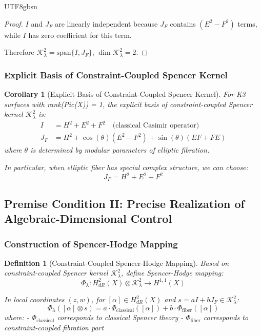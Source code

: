 \documentclass[a4paper,12pt]{extarticle}
\newtheorem{corollary}[theorem]{Corollary}
\newtheorem{definition}[theorem]{Definition}
\theoremstyle{definition}
\begin{document}
\begin{CJK}{UTF8}{gbsn}
\begin{proof}
$I$ and $J_F$ are linearly independent because $J_F$ contains $(E^2 - F^2)$ terms, while $I$ has zero coefficient for this term.

Therefore $\mathcal{K}^2_\lambda = \text{span}\{I, J_F\}$, $\dim \mathcal{K}^2_\lambda = 2$.
\end{proof}

\subsubsection{Explicit Basis of Constraint-Coupled Spencer Kernel}
\label{subsubsec:explicit_spencer_kernel_basis}

\begin{corollary}[Explicit Basis of Constraint-Coupled Spencer Kernel]
\label{cor:explicit_spencer_kernel_basis}
For K3 surfaces with rank(Pic(X)) = 1, the explicit basis of constraint-coupled Spencer kernel $\mathcal{K}^2_\lambda$ is:
\begin{align}
I &= H^2 + E^2 + F^2 \quad \text{(classical Casimir operator)}\\
J_F &= H^2 + \cos(\theta)(E^2 - F^2) + \sin(\theta)(EF + FE)
\end{align}
where $\theta$ is determined by modular parameters of elliptic fibration.

In particular, when elliptic fiber has special complex structure, we can choose:
$$J_F = H^2 + E^2 - F^2$$
\end{corollary}

\subsection{Premise Condition II: Precise Realization of Algebraic-Dimensional Control}
\label{subsec:premise_II_dimension_control}

\subsubsection{Construction of Spencer-Hodge Mapping}
\label{subsubsec:spencer_hodge_map_construction}

\begin{definition}[Constraint-Coupled Spencer-Hodge Mapping]
\label{def:constraint_spencer_hodge_map}
Based on constraint-coupled Spencer kernel $\mathcal{K}^2_\lambda$, define Spencer-Hodge mapping:
$$\Phi_\lambda: H^2_{dR}(X) \otimes \mathcal{K}^2_\lambda \to H^{1,1}(X)$$

In local coordinates $(z, w)$, for $[\alpha] \in H^2_{dR}(X)$ and $s = aI + bJ_F \in \mathcal{K}^2_\lambda$:
$$\Phi_\lambda([\alpha] \otimes s) = a \cdot \Phi_{\text{classical}}([\alpha]) + b \cdot \Phi_{\text{fiber}}([\alpha])$$
where:
- $\Phi_{\text{classical}}$ corresponds to classical Spencer theory
- $\Phi_{\text{fiber}}$ corresponds to constraint-coupled fibration part
\end{definition}


\end{CJK}
\end{document}
